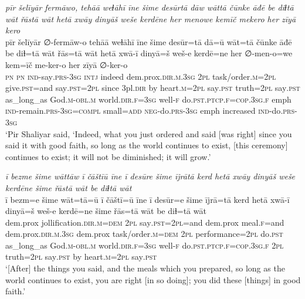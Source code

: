 \ea \label{ŽP.243}
\textit{pīr šelīyār fermāwo, tehāā weɫāhī īne šime desūrtā dāw wāttā čūnke āđē be diɫtā wāt řāstā wāt hetā xwāy dinyāš weše kerdēne her menowe kemīč mekero her zīyā kero} \\ 
\gll pīr šelīyār ∅-fermāw-o tehāā weɫāhī īne šime desūr=tā dā=ū wāt=tā čūnke āđē be diɫ=tā wāt řās=tā wāt hetā xwā-ī dinyā=š weš-e kerdē=ne her ∅-men-o=we kem=īč me-ker-o her zīyā ∅-ker-o \\ 
 \textsc{pn} \textsc{pn} \textsc{ind-}say\textsc{.prs}\textsc{-3sg} \textsc{intj} indeed dem.prox\textsc{.dir}\textsc{.m}\textsc{.3sg} \textsc{2pl} task/order\textsc{.m}=\textsc{2pl} give\textsc{.pst}=and say\textsc{.pst}=\textsc{2pl} since 3pl\textsc{.dir} by heart\textsc{.m}=\textsc{2pl} say\textsc{.pst} truth=\textsc{2pl} say\textsc{.pst} as\_long\_as God\textsc{.m}\textsc{-obl}\textsc{.m} world\textsc{.dir}\textsc{.f}\textsc{=3sg} well\textsc{-f} do\textsc{.pst}\textsc{.ptcp}\textsc{.f}\textsc{=cop}\textsc{.3sg}\textsc{.f} emph \textsc{ind-}remain\textsc{.prs}\textsc{-3sg}\textsc{=compl} small\textsc{=add} \textsc{neg-}do\textsc{.prs}\textsc{-3sg} emph increased \textsc{ind-}do\textsc{.prs}\textsc{-3sg} \\ 
\glt `Pir Shaliyar said, ‘Indeed, what you just ordered and said [was right] since you said it with good faith, so long as the world continues to exist, [this ceremony] continues to exist; it will not be diminished; it will grow.'
\z 
 
\ea \label{ŽP.244}
\textit{ī bezme šime wāttāw ī čāštīū īne ī desūre šime ījrātā kerd hetā xwāy dinyāš weše kerdēne šime řāstā wāt be diɫtā wāt} \\ 
\gll ī bezm=e šime wāt=tā=ū ī čāštī=ū īne ī desūr=e šime ījrā=tā kerd hetā xwā-ī dinyā=š weš-e kerdē=ne šime řās=tā wāt be diɫ=tā wāt \\ 
 dem.prox jollification\textsc{.dir}\textsc{.m}\textsc{=dem} \textsc{2pl} say\textsc{.pst}=\textsc{2pl}=and dem.prox meal\textsc{.f}=and dem.prox\textsc{.dir}\textsc{.m}\textsc{.3sg} dem.prox task/order\textsc{.m}\textsc{=dem} \textsc{2pl} performance=\textsc{2pl} do\textsc{.pst} as\_long\_as God\textsc{.m}\textsc{-obl}\textsc{.m} world\textsc{.dir}\textsc{.f}\textsc{=3sg} well\textsc{-f} do\textsc{.pst}\textsc{.ptcp}\textsc{.f}\textsc{=cop}\textsc{.3sg}\textsc{.f} \textsc{2pl} truth=\textsc{2pl} say\textsc{.pst} by heart\textsc{.m}=\textsc{2pl} say\textsc{.pst} \\ 
\glt `[After] the things you said, and the meals which you prepared, so long as the world continues to exist, you are right [in so doing]; you did these [things] in good faith.'
\z 
 
